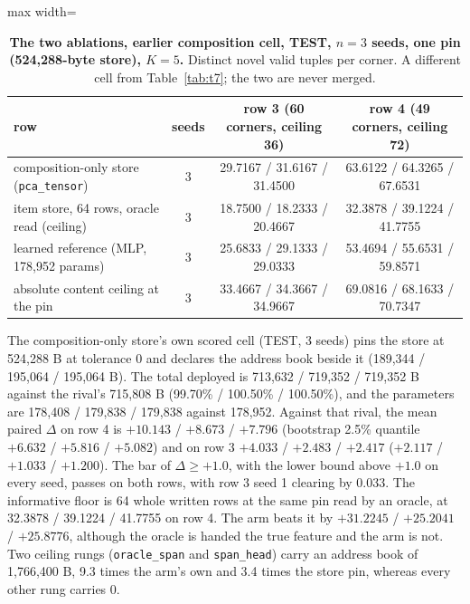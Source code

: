 \documentclass{article} %
\begin{document}
\begin{table}[h]
\centering\small
\caption{\textbf{The two ablations, earlier composition cell, TEST, $n=3$ seeds, one pin
(524,288-byte store), $K=5$.} Distinct novel valid tuples per corner. A different cell from %
Table~\ref{tab:t7}; the two are never merged.}
\label{tab:ablations}
\setlength{\tabcolsep}{3pt}
\begin{adjustbox}{max width=\linewidth}\begin{tabular}{lccc}
\toprule
row & seeds & row 3 (60 corners, ceiling 36) & row 4 (49 corners, ceiling 72) \\ %
\midrule
composition-only store (\texttt{pca\_tensor}) & 3 & 29.7167 / 31.6167 / 31.4500 & 63.6122 / 64.3265 / 67.6531 \\
item store, 64 rows, oracle read (ceiling) & 3 & 18.7500 / 18.2333 / 20.4667 & 32.3878 / 39.1224 / 41.7755 \\
learned reference (MLP, 178,952 params) & 3 & 25.6833 / 29.1333 / 29.0333 & 53.4694 / 55.6531 / 59.8571 \\
absolute content ceiling at the pin & 3 & 33.4667 / 34.3667 / 34.9667 & 69.0816 / 68.1633 / 70.7347 \\
\bottomrule
\end{tabular}\end{adjustbox}
\end{table}



The composition-only store's own scored cell (TEST, 3 seeds) pins the store at 524,288 B at
tolerance 0 and declares the address book beside it (189,344 / 195,064 / 195,064 B). The total
deployed is 713,632 / 719,352 / 719,352 B against the rival's 715,808 B (99.70\% / 100.50\% /
100.50\%), and the parameters are 178,408 / 179,838 / 179,838 against 178,952. %
Against that rival, the mean paired $\Delta$ on row 4 is $+10.143$ / $+8.673$ / $+7.796$ (bootstrap
2.5\% quantile $+6.632$ / $+5.816$ / $+5.082$) and on row 3 $+4.033$ / $+2.483$ / $+2.417$
($+2.117$ / $+1.033$ / $+1.200$). The bar of $\Delta\ge+1.0$, with the lower bound above $+1.0$ on
every seed, passes on both rows, with row 3 seed 1 clearing by 0.033.
The informative floor is 64 whole written rows at the same pin read by an oracle, at 32.3878 /
39.1224 / 41.7755 on row 4. The arm beats it by $+31.2245$ / $+25.2041$ / $+25.8776$, although the
oracle is handed the true feature and the arm is not. %
Two ceiling rungs (\texttt{oracle\_span} and \texttt{span\_head}) carry an address book of 1,766,400
B, 9.3 times the arm's own and 3.4 times the store pin, whereas every other rung carries 0.
\end{document}

